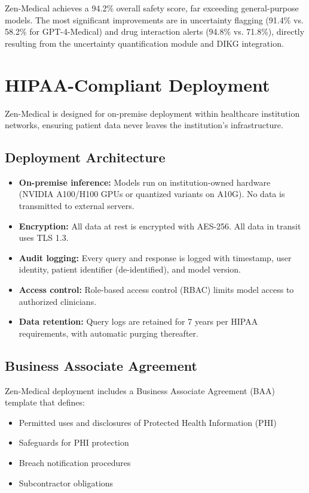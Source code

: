 \documentclass[11pt,a4paper]{article}
\begin{document}
Zen-Medical achieves a 94.2\% overall safety score, far exceeding general-purpose models. The most significant improvements are in uncertainty flagging (91.4\% vs. 58.2\% for GPT-4-Medical) and drug interaction alerts (94.8\% vs. 71.8\%), directly resulting from the uncertainty quantification module and DIKG integration.

\section{HIPAA-Compliant Deployment}
\label{sec:deployment}

Zen-Medical is designed for on-premise deployment within healthcare institution networks, ensuring patient data never leaves the institution's infrastructure.

\subsection{Deployment Architecture}

\begin{itemize}
    \item \textbf{On-premise inference:} Models run on institution-owned hardware (NVIDIA A100/H100 GPUs or quantized variants on A10G). No data is transmitted to external servers.
    \item \textbf{Encryption:} All data at rest is encrypted with AES-256. All data in transit uses TLS 1.3.
    \item \textbf{Audit logging:} Every query and response is logged with timestamp, user identity, patient identifier (de-identified), and model version.
    \item \textbf{Access control:} Role-based access control (RBAC) limits model access to authorized clinicians.
    \item \textbf{Data retention:} Query logs are retained for 7 years per HIPAA requirements, with automatic purging thereafter.
\end{itemize}

\subsection{Business Associate Agreement}

Zen-Medical deployment includes a Business Associate Agreement (BAA) template that defines:
\begin{itemize}
    \item Permitted uses and disclosures of Protected Health Information (PHI)
    \item Safeguards for PHI protection
    \item Breach notification procedures
    \item Subcontractor obligations
\end{itemize}
\end{document}
